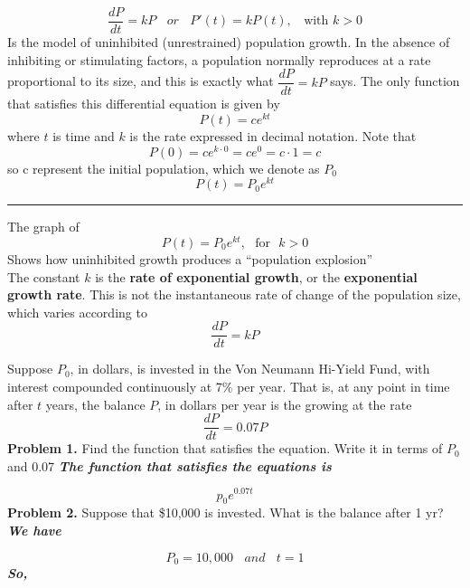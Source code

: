 \documentclass{report}
\begin{document}
$$ \dfrac{dP}{dt} = kP \ \ \ \ or \ \ \ \ P'(t) = kP(t), \ \ \ \ \text{with }  k > 0$$
\bigbreak \noindent
Is the model of uninhibited (unrestrained) population growth. In the absence of inhibiting or stimulating factors, a population normally reproduces at a rate proportional to its size, and this is exactly what $\dfrac{dP}{dt} = kP$ says. The only function that satisfies this differential equation is given by
$$ P(t) = ce^{kt}$$
where $t$ is time and $k$ is the rate expressed in decimal notation. Note that
$$ P(0) = ce^{k\cdot0} = ce^{0} = c \cdot 1 = c$$
so c represent the initial population, which we denote as $P_0$
$$ P(t) = P_0e^{kt}$$
\bigbreak \noindent
\hrule
\bigbreak \noindent
\begin{minipage}{0.5\textwidth}
The graph of	
$$ P(t) = P_0e^{kt}, \ \ \ \text{for} \ \ \ k > 0$$
Shows how uninhibited growth produces a ``population explosion'' \\
The constant $k$ is the \textbf{rate of exponential growth}, or the \textbf{exponential growth rate}. This is not the instantaneous rate of change of the population size, which varies according to
$$ \dfrac{dP}{dt} = kP$$
\end{minipage}
\begin{minipage}{0.45\textwidth}
\end{minipage}
\pagebreak
\q
Suppose $P_0$, in dollars, is invested in the Von Neumann Hi-Yield Fund, with interest compounded continuously at 7\% per year. That is, at any point in time after $t$ years, the balance $P$, in dollars per year is the growing at the rate
$$ \dfrac{dP}{dt} = 0.07P$$
\bigbreak \noindent
\textbf{Problem 1.} Find the function that satisfies the equation. Write it in terms of $P_0$ and 0.07
\bigbreak \noindent
\textit{\textbf{The function that satisfies the equations is}}

$$ p_0e^{0.07t}$$
\bigbreak\noindent
\textbf{Problem 2.} Suppose that \$10,000 is invested. What is the balance after 1 yr?
\bigbreak \noindent
\textit{\textbf{We have}}

$$P_0 = 10,000 \ \ \ \ and \ \ \ \ t = 1$$
\textit{\textbf{So,}}
\end{document}
